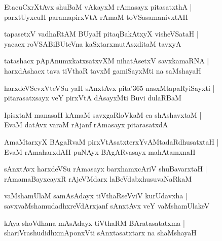 \documentclass[twoside,12pt,openright]{book}
\newcounter{shloka}[chapter]
\begin{document}
\begin{shloka}
EtacuCxrXtAvx shuBaM vAkayxM rAmasayx pitasatxthA |\\
parxtUyxcuH paramapirxVtA rAmaM toVSasamanivxtAH
\end{shloka}

\begin{shloka}
tapasetxV vadhaRtAM BUyaH pitaqBakAtxyX visheVSataH |\\
yacacx roVSABiBUteVna kaSxtarxmutAsxditaM tavxyA 
\end{shloka}

\begin{shloka}
tatashacx pApAnumxkatxsatxvXM nihatAsetxV savxkamaRNA |\\
harxdAshacx tava tiVthaR tavxM gamiSayxMti na saMshayaH
\end{shloka}


\begin{shloka}
harxdeVSevxVteVSu yaH sAnxtAvx pita\char'365 nasxMtapaRyiSayxti |\\
pitarasatxsayx veY pirxVtA dAsayxMti Buvi dulaRBaM 
\end{shloka}

\begin{shloka}
IpisxtaM manasaH kAmaM savxgaRloVkaM ca shAshavxtaM |\\
EvaM datAvx varaM rAjanf rAmasayx pitarasatxdA 
\end{shloka}

\begin{shloka}
AmaMtarxyX BAgaRvaM pirxVtAsatxterxYvAMtadaRdhusatxtaH |\\
EvaM rAmaharxdAH puNAyx BAgARvasayx mahAtamxnaH 
\end{shloka}

\begin{shloka}
sAnxtAvx harxdeVSu rAmasayx barxhamxcAriV shuBavarxtaH |\\
rAmamaBayxcayxR rAjeVMdarx laBeVdabxhusuvaNaRkaM 
\end{shloka}

\begin{shloka}
vaMshamUlaM samAsAdayx tiVthaRseVviV kurUdavxha |\\
savxvaMshamudadhxreVdArxjanf sAnxtAvx veY vaMshamUlakeV
\end{shloka}

\begin{shloka}
kAya shoVdhana mAsAdayx tiVthaRM BAratasatatxma |\\
shariVrashudidhxmAponxVti sAnxtasatxtarx na shaMshayaH 
\end{shloka}
\end{document}
